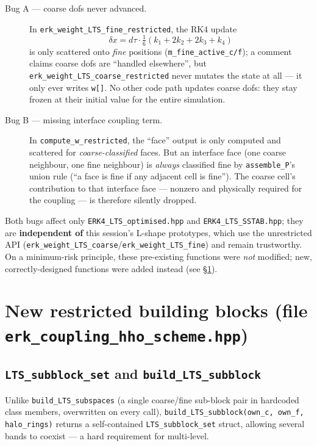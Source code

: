 \documentclass[11pt]{article}
\newcommand{\code}[1]{\texttt{#1}}
\begin{document}
\begin{description}
  \item[Bug A --- coarse dofs never advanced.] In
  \code{erk\_weight\_LTS\_fine\_restricted}, the RK4 update
  \[
    \delta x = d\tau \cdot \tfrac{1}{6}(k_1+2k_2+2k_3+k_4)
  \]
  is only scattered onto \emph{fine} positions
  (\code{m\_fine\_active\_c/f}); a comment claims coarse dofs are
  ``handled elsewhere'', but \code{erk\_weight\_LTS\_coarse\_restricted}
  never mutates the state at all --- it only ever writes \code{w[]}. No
  other code path updates coarse dofs: they stay frozen at their initial
  value for the entire simulation.
  \item[Bug B --- missing interface coupling term.] In
  \code{compute\_w\_restricted}, the ``face'' output is only computed and
  scattered for \emph{coarse-classified} faces. But an interface face
  (one coarse neighbour, one fine neighbour) is \emph{always} classified
  fine by \code{assemble\_P}'s union rule (``a face is fine if any
  adjacent cell is fine''). The coarse cell's contribution to that
  interface face --- nonzero and physically required for the coupling ---
  is therefore silently dropped.
\end{description}

Both bugs affect only \code{ERK4\_LTS\_optimised.hpp} and
\code{ERK4\_LTS\_SSTAB.hpp}; they are \textbf{independent of} this
session's L-shape prototypes, which use the unrestricted API
(\code{erk\_weight\_LTS\_coarse}/\code{erk\_weight\_LTS\_fine}) and remain
trustworthy. On a minimum-risk principle, these pre-existing functions
were \emph{not} modified; new, correctly-designed functions were added
instead (see \S\ref{sec:v2}).

\section{New restricted building blocks (file \code{erk\_coupling\_hho\_scheme.hpp})}
\label{sec:v2}

\subsection{\code{LTS\_subblock\_set} and \code{build\_LTS\_subblock}}

Unlike \code{build\_LTS\_subspaces} (a single coarse/fine sub-block pair
in hardcoded class members, overwritten on every call),
\code{build\_LTS\_subblock(own\_c, own\_f, halo\_rings)} returns a
self-contained \code{LTS\_subblock\_set} struct, allowing several bands
to coexist --- a hard requirement for multi-level.
\end{document}
